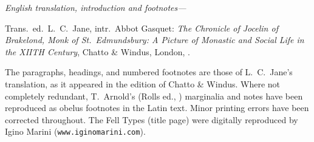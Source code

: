 \documentclass{book}
\begin{document}
{{\vspace{0.4cm}

\emph{English translation, introduction and footnotes---}

Trans.\ ed.\ L.\ C.\ Jane, intr.\ Abbot Gasquet: \emph{The Chronicle of Jocelin of Brakelond, Monk of St.\ Edmundsbury: A Picture of Monastic and Social Life in the XII{\tiny TH} Century}, Chatto \& Windus, London, .

}


\newpage


\thispagestyle{empty}
\begin{center}

\hspace{0pt}
\vfill

{

\parbox{5.5cm}{
}
}

\vfill
\hspace{0pt}

\end{center}


\cleardoublepage

\begin{center}

\hspace{0cm}\vspace{1.0cm}

\parbox{8cm}{

\begin{center}
\end{center}

\vspace{.25cm}
{
The paragraphs, headings, and numbered footnotes are those of L.\ C.\ Jane's translation, as it appeared in the  edition of Chatto \& Windus. Where not completely redundant, T.\ Arnold's (Rolls ed., ) marginalia and notes have been reproduced as obelus footnotes in the Latin text. Minor printing errors have been corrected throughout. The Fell Types (title page) were digitally reproduced by Igino Marini (\texttt{www.iginomarini.com}).
}
}


\end{center}}
\end{document}
